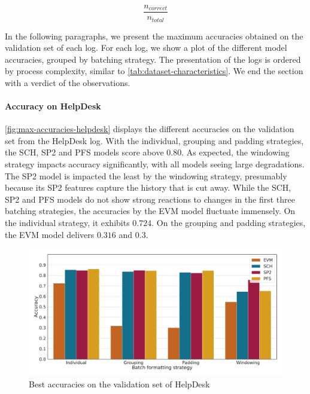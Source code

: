 $$\frac{n_{correct}}{n_{total}} $$

In the following paragraphs, we present the maximum accuracies obtained on the validation set of each log.
For each log, we show a plot of the different model accuracies, grouped by batching strategy.
The presentation of the logs is ordered by process complexity, similar to \autoref{tab:dataset-characteristics}.
We end the section with a verdict of the observations.\\

\paragraph{Accuracy on HelpDesk}
\autoref{fig:max-accuracies-helpdesk} displays the different accuracies on the validation set from the HelpDesk log.
With the individual, grouping and padding strategies, the SCH, SP2 and PFS models score above $0.80$.
As expected, the windowing strategy impacts accuracy significantly, with all models seeing large degradations.
The SP2 model is impacted the least by the windowing strategy, presumably because its SP2 features capture the history that is cut away.
While the SCH, SP2 and PFS models do not show strong reactions to changes in the first three batching strategies, the accuracies by the EVM model fluctuate immensely.
On the individual strategy, it exhibits $0.724$.
On the grouping and padding strategies, the EVM model delivers $0.316$ and $0.3$.

\begin{figure}[!htb]
    \centering
    \includegraphics[width=\textwidth]{gfx/helpdesk/accuracies.pdf}
    \caption{Best accuracies on the validation set of HelpDesk}
    \label{fig:max-accuracies-helpdesk}
\end{figure}

